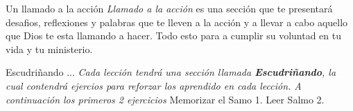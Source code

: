 \begin{paperbox}{Un llamado a la acción}
  \textit{Llamado a la acción} es una sección que te presentará
  desafios, reflexiones y palabras que te lleven a la acción y  a llevar a
  cabo aquello que Dios te esta llamando a hacer. Todo esto para a cumplir su
  voluntad en tu vida y tu ministerio.
\end{paperbox}


\begin{monsterbox}{Escudriñando ... }
  \textit{Cada lección tendrá una sección llamada
    \textbf{Escudriñando}, la cual contendrá  ejercios para
    reforzar los aprendido en cada lección. A continuación los primeros
    2 ejercicios}
  \hline%
  Memorizar el Samo 1.
  \hline%
  Leer Salmo 2.
  \vspace{5mm}
\end{monsterbox}
